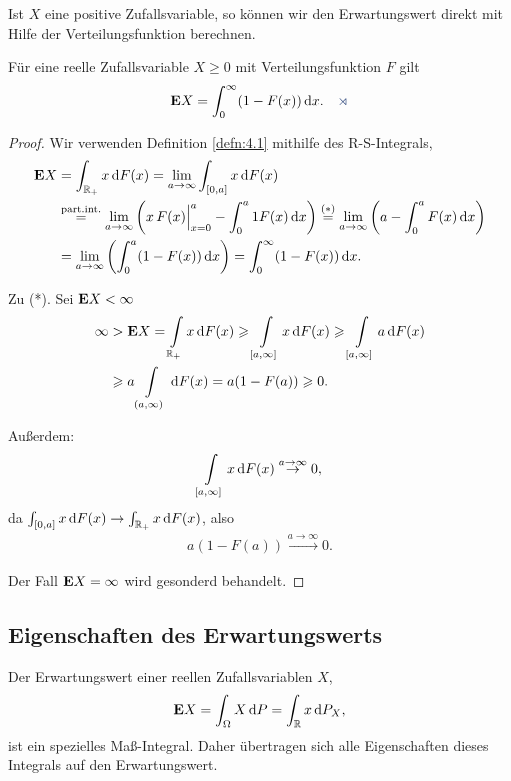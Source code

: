 Ist $X$ eine positive Zufallsvariable, so können wir den Erwartungswert
direkt mit Hilfe der Verteilungsfunktion berechnen.
\begin{lem}
\label{lem:4.1}
Für eine reelle Zufallsvariable $X \geq 0$ mit Verteilungsfunktion $F$ gilt
\begin{align*}
\E X = \int^{\infty}_{0} (1-F(x))\dx.\fishhere
\end{align*}
\end{lem}
\begin{proof}
Wir verwenden Definition \ref{defn:4.1} mithilfe des R-S-Integrals,
\begin{align*}
\textbf{E} X &= 
\int_{\mathbb{R}_+} x\,\mathrm{d} F(x) = \lim\limits_{a\to\infty}
\int_{[0,a]} x\,\mathrm{d} F(x)\\
&\overset{\text{part.int.}}{=}
\lim\limits_{a\to\infty} \left(
x\,F(x)\Big|_{x=0}^a - 
\int_0^a 1F(x)\,\mathrm{d} x
\right)
\overset{(*)}{=}
\lim\limits_{a\to\infty}
\left(a - \int_0^a F(x)\,\mathrm{d} x \right)\\
&=
\lim\limits_{a\to\infty}
\left(\int_0^a (1-F(x))\,\mathrm{d} x \right)
= 
\int_0^\infty (1-F(x))\,\mathrm{d} x.
\end{align*}
\begin{proofenumarabic}
\item Zu (*). Sei $\textbf{E} X < \infty$
\begin{align*}
\infty &> \textbf{E} X = \int\limits_{\mathbb{R}_+} x\,\mathrm{d} F(x)
\geqslant \int\limits_{[a,\infty]}x\,\mathrm{d} F(x)
\geqslant \int\limits_{[a,\infty]}a\,\mathrm{d} F(x)\\
&\geqslant a\int\limits_{(a,\infty)}\,\mathrm{d} F(x)
= a(1-F(a)) \geqslant 0.
\end{align*}
\item Außerdem:
\begin{align*}
\int\limits_{[a,\infty]} x\,\mathrm{d} F(x) \overset{a\to\infty}{\to} 0,
\end{align*}
da $\int_{[0,a]} x\,\mathrm{d} F(x) \to \int_{\mathbb{R}_+} x\,\mathrm{d} F(x)$, also
\begin{align*}
a(1-F(a))\overset{a\to\infty}{\to}0.
\end{align*}
\end{proofenumarabic}
Der Fall $\textbf{E} X = \infty$ wird gesonderd behandelt.\qedhere
\end{proof}

\subsection{Eigenschaften des Erwartungswerts}

Der Erwartungswert einer reellen Zufallsvariablen $X$,
\begin{align*}
\textbf{E} X = \int_\Omega X\,\mathrm{d} P = \int_{\mathbb{R}} x \,\mathrm{d} P_X,
\end{align*}
ist ein spezielles Maß-Integral. Daher übertragen sich alle Eigenschaften
dieses Integrals auf den Erwartungswert.

